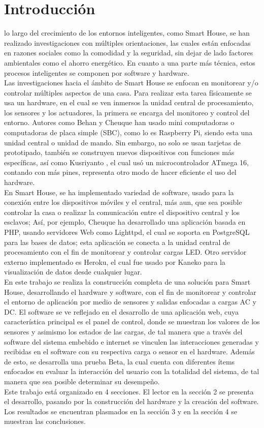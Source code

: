 \section{Introducción}

  lo largo del crecimiento de los entornos inteligentes, como Smart House, se han realizado investigaciones con múltiples orientaciones, las cuales están enfocadas en razones sociales como la comodidad y la seguridad, sin dejar de lado factores ambientales como el ahorro energético. En cuanto a una parte más técnica, estos procesos inteligentes se componen por software y hardware.\\ 
 
 Las investigaciones hacia el ámbito de Smart House se enfocan en monitorear y/o controlar múltiples aspectos de una casa. Para realizar esta tarea físicamente se usa un hardware, en el cual se ven inmersos la unidad central de procesamiento, los sensores y los actuadores, la primera se encarga del monitoreo y control del entorno. Autores como Behan \cite{Behan2013} y Cheuque \cite{Cheuque2015} han usado mini computadoras o computadoras de placa simple (SBC), como lo es Raspberry Pi, siendo esta una unidad central o unidad de mando. Sin embargo, no solo se usan tarjetas de prototipado, también se construyen nuevos dispositivos con funciones más específicas, así como Kusriyanto \cite{Kusriyanto2015}, el cual usó un microcontrolador ATmega 16, contando con más pines, representa otro modo de hacer eficiente el uso del hardware.\\ 
 
 En Smart House, se ha implementado variedad de software, usado para la conexión entre los dispositivos móviles y el central, más aun, que sea posible controlar la casa o realizar la comunicación entre el dispositivo central y los esclavos; Así, por ejemplo, Cheuque \cite{Cheuque2015} ha desarrollado una aplicación basada en PHP, usando servidores Web como Lighttpd, el cual se soporta en PostgreSQL para las bases de datos; esta aplicación se conecta a la unidad central de procesamiento con el fin de monitorear y controlar cargas LED. Otro servidor externo implementado es Heroku, el cual fue usado por Kaneko \cite{Kaneko2017} para la visualización de datos desde cualquier lugar.\\ 
 
 En este trabajo se realiza la construcción completa de una solución para Smart House, desarrollando el hardware y software, con el fin de monitorear y controlar el entorno de aplicación por medio de sensores y salidas enfocadas a cargas AC y DC. El software se ve reflejado en el desarrollo de una aplicación web, cuya característica principal es el panel de control, donde se muestran los valores de los sensores y asimismo los estados de las cargas, de tal manera que a través del software del sistema embebido e internet se vinculen las interacciones generadas y recibidas en el software con su respectiva carga o sensor en el hardware. Además de esto, se desarrolla una prueba Beta, la cual cuenta con diferentes ítems enfocados en evaluar la interacción del usuario con la totalidad del sistema, de tal manera que sea posible determinar su desempeño.\\ 
 
 Este trabajo está organizado en 4 secciones. El lector en la sección 2 se presenta el desarrollo, pasando por la construcción del hardware y la creación del software. Los resultados se encuentran plasmados en la sección 3 y en la sección 4 se muestran las conclusiones.
 
 
